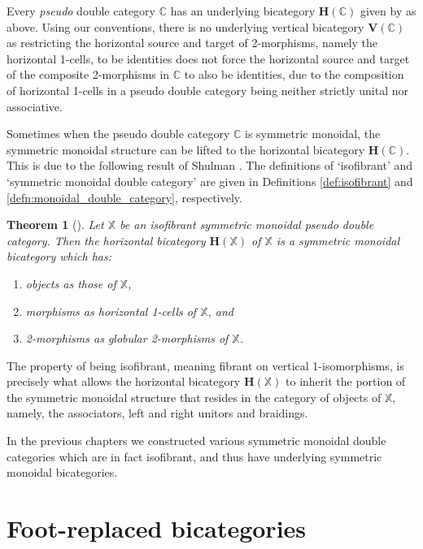 \documentclass[oneside,final]{ucr}
\newtheorem{theorem}{Theorem}[section]
\theoremstyle{definition}
\newcommand{\lX}{\mathbb{X}}
\begin{document}
{Every \emph{pseudo} double category $\mathbb{C}$ has an underlying bicategory $\mathbf{H}(\mathbb{C})$ given by as above. Using our conventions, there is no underlying vertical bicategory $\mathbf{V}(\mathbb{C})$ as restricting the horizontal source and target of 2-morphisms, namely the horizontal 1-cells, to be identities does not force the horizontal source and target of the composite 2-morphisms in $\mathbb{C}$ to also be identities, due to the composition of horizontal 1-cells in a pseudo double category being neither strictly unital nor associative. 

Sometimes when the pseudo double category $\mathbb{C}$ is symmetric monoidal, the symmetric monoidal structure can be lifted to the horizontal bicategory $\mathbf{H}(\mathbb{C})$. This is due to the following result of Shulman \cite{Shul}. The definitions of `isofibrant' and `symmetric monoidal double category' are given in Definitions \ref{def:isofibrant} and \ref{defn:monoidal_double_category}, respectively. 

\begin{theorem}[{{\cite[Thm.\ 1.2]{Shul}}}]\label{Shulman1}
Let $\mathbb{X}$ be an isofibrant symmetric monoidal pseudo double category. Then the horizontal bicategory $\mathbf{H}(\mathbb{X})$ of $\mathbb{X}$ is a symmetric monoidal bicategory which has:
\begin{enumerate}
\item{objects as those of $\mathbb{X}$,}
\item{morphisms as horizontal 1-cells of $\mathbb{X}$, and}
\item{2-morphisms as globular 2-morphisms of $\mathbb{X}$.}
\end{enumerate}
\end{theorem}

The property of being isofibrant, meaning fibrant on vertical 1-isomorphisms, is precisely what allows the horizontal bicategory $\mathbf{H}(\lX)$ to inherit the portion of the symmetric monoidal structure that resides in the category of objects of $\lX$, namely, the associators, left and right unitors and braidings.

In the previous chapters we constructed various symmetric monoidal double categories which are in fact isofibrant, and thus have underlying symmetric monoidal bicategories.

\section{Foot-replaced bicategories}

}
\end{document}
